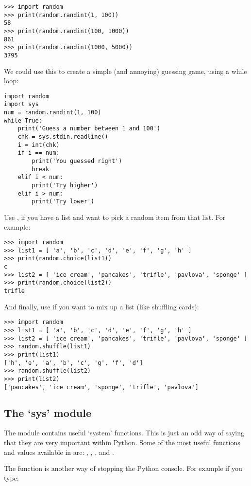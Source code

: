 \begin{Verbatim}[frame=single]
>>> import random
>>> print(random.randint(1, 100))
58
>>> print(random.randint(100, 1000))
861
>>> print(random.randint(1000, 5000))
3795
\end{Verbatim}

We could use this to create a simple (and annoying) guessing game, using a while loop:

\begin{Verbatim}[frame=single]
import random
import sys
num = random.randint(1, 100)
while True:
    print('Guess a number between 1 and 100')
    chk = sys.stdin.readline()
    i = int(chk)
    if i == num:
        print('You guessed right')
        break
    elif i < num:
        print('Try higher')
    elif i > num:
        print('Try lower')
\end{Verbatim}

Use ,  if you have a list and want to pick a random item from that list. For example:

\begin{Verbatim}[frame=single]
>>> import random
>>> list1 = [ 'a', 'b', 'c', 'd', 'e', 'f', 'g', 'h' ]
>>> print(random.choice(list1))
c
>>> list2 = [ 'ice cream', 'pancakes', 'trifle', 'pavlova', 'sponge' ]
>>> print(random.choice(list2))
trifle
\end{Verbatim}

And finally, use  if you want to mix up a list (like shuffling cards):

\begin{Verbatim}[frame=single]
>>> import random
>>> list1 = [ 'a', 'b', 'c', 'd', 'e', 'f', 'g', 'h' ]
>>> list2 = [ 'ice cream', 'pancakes', 'trifle', 'pavlova', 'sponge' ]
>>> random.shuffle(list1)
>>> print(list1)
['h', 'e', 'a', 'b', 'c', 'g', 'f', 'd']
>>> random.shuffle(list2)
>>> print(list2)
['pancakes', 'ice cream', 'sponge', 'trifle', 'pavlova']
\end{Verbatim}

\subsection*{The `sys' module}

The  module contains useful `system' functions. This is just an odd way of saying that they are very important within Python. Some of the most useful functions and values available in  are: , , , and .
\par
The  function is another way of stopping the Python console. For example if you type:

